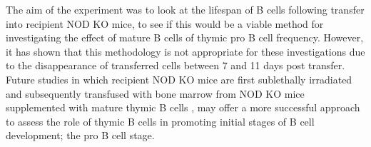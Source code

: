 The aim of the experiment was to look at the lifespan of B cells following transfer into recipient NOD KO mice, to see if this would be a viable method for investigating the effect of mature B cells of thymic pro B cell frequency.
However, it has shown that this methodology is not appropriate for these investigations due to the disappearance of transferred cells between 7 and 11 days post transfer.
Future studies in which recipient NOD KO mice are first sublethally irradiated and subsequently transfused with bone marrow from NOD KO mice supplemented with mature thymic B cells \citep{Serreze1998}, may offer a more successful approach to assess the role of thymic B cells in promoting initial stages of B cell development; the pro B cell stage.


